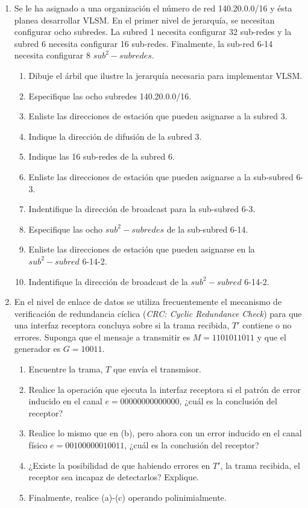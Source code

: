 \begin{enumerate}
    \item Se le ha asignado a una organizaci\'on el n\'umero de red 140.20.0.0/16 y \'esta planea desarrollar VLSM. En el primer
    nivel de jerarqu\'ia, se necesitan configurar ocho subredes. La subred 1 necesita configurar 32 sub-redes y la subred 6
    necesita configurar 16 sub-redes. Finalmente, la sub-red 6-14 necesita configurar 8 \(sub^2-subredes\).
    \begin{enumerate}
        \item Dibuje el \'arbil que ilustre la jerarqu\'ia necesaria para implementar VLSM.
        \item Especifique las ocho subredes 140.20.0.0/16.
        \item Enliste las direcciones de estaci\'on que pueden asignarse a la subred 3.
        \item Indique la direcci\'on de difusi\'on de la subred 3.
        \item Indique las 16 sub-redes de la subred 6.
        \item Enliste las direcciones de estaci\'on que pueden asignarse a la sub-subred 6-3.
        \item Indentifique la direcci\'on de broadcast para la sub-subred 6-3.
        \item Especifique las ocho \(sub^2-subredes\) de la sub-subred 6-14.
        \item Enliste las direcciones de estaci\'on que pueden asignarse en la \(sub^2-subred\) 6-14-2.
        \item Indentifique la direcci\'on de broadcast de la \(sub^2-subred\) 6-14-2.
    \end{enumerate}

    \item En el nivel de enlace de datos se utiliza frecuentemente el mecanismo de verificaci\'on de redundancia c\'iclica 
    (\textit{CRC: Cyclic Redundance Check}) para que una interfaz receptora concluya sobre si la trama recibida, \(T'\) contiene
    o no errores. Suponga que el mensaje a transmitir es \(M=1101011011\) y que el generador es \(G=10011\).
    \begin{enumerate}
        \item Encuentre la trama, \(T\) que env\'ia el transmisor.
        \item Realice la operaci\'on que ejecuta la interfaz receptora si el patr\'on de error inducido en el canal
        \(e=00000000000000\), ¿cu\'al es la conclusi\'on del receptor?
        \item Realice lo mismo que en (b), pero ahora con un error inducido en el canal f\'isico \(e=00100000010011\), 
        ¿cu\'al es la conclusi\'on del receptor?
        \item ¿Existe la posibilidad de que habiendo errores en \(T'\), la trama recibida, el receptor sea incapaz de detectarlos?
        Explique.
        \item Finalmente, realice (a)-(c) operando polinimialmente.
    \end{enumerate}
\end{enumerate}